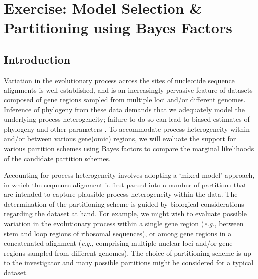 %
%
\newpage
\FloatBarrier
\section{Exercise: Model Selection \& Partitioning using Bayes Factors}

\subsection{Introduction}
%
%

Variation in the evolutionary process across the sites of nucleotide 
sequence alignments is well established, and is an increasingly pervasive feature of datasets 
composed of gene regions sampled from multiple loci and/or different genomes.
Inference of phylogeny from these data demands that we adequately model the underlying process heterogeneity; 
failure to do so can lead to biased estimates of phylogeny and other parameters \citep{brown07}.
To accommodate process heterogeneity within and/or between various gene(omic)
regions, we will evaluate the support for various partition schemes 
using Bayes factors to compare the marginal likelihoods of the candidate partition schemes.

Accounting for process heterogeneity involves adopting a `mixed-model' approach, \citep{ronquist03} in which the sequence alignment is first parsed into a number of partitions that are intended to capture plausible process heterogeneity within the data.
The determination of the partitioning scheme is guided by biological considerations regarding the dataset at hand.
For example, we might wish to evaluate possible variation in the evolutionary process within a single gene region ({\it e.g.}, between stem and loop regions of ribosomal sequences), or among gene regions in a concatenated alignment ({\it e.g.}, comprising multiple nuclear loci and/or gene regions sampled from different genomes).
The choice of partitioning scheme is up to the investigator and many possible partitions might be considered for a typical dataset.

